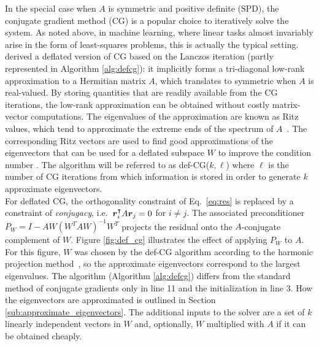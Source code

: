 \documentclass{article}
\begin{document}
In the special case when $A$ is symmetric and positive definite (SPD), the conjugate gradient method (CG) \cite{hestenes52} is a popular choice to iteratively solve the system. As noted above, in machine learning, where linear tasks almost invariably arise in the form of least-squares problems, this is actually the typical setting. \citet{saad00} derived a deflated version of CG based on the Lanczos iteration (partly represented in Algorithm \ref{alg:defcg}): it implicitly forms a tri-diagonal low-rank approximation to a Hermitian matrix $A$, which translates to symmetric when $A$ is real-valued. By storing quantities that are readily available from the CG iterations, the low-rank approximation can be obtained without costly matrix-vector computations. 
The eigenvalues of the approximation are known as Ritz values, which tend to approximate the extreme ends of the spectrum of $A$~\cite{saad11}. The corresponding Ritz vectors are used to find good approximations of the eigenvectors that can be used for a deflated subspace $W$ to improve the condition number \cite[see][for more details]{saad00}. 
The algorithm will be referred to as def-CG($k,\ell$) where $\ell$ is the number of CG iterations from which information is stored in order to generate $k$ approximate eigenvectors. 
\\
For deflated CG, the orthogonality constraint of Eq.~\eqref{eq:res} is replaced by a constraint of \emph{conjugacy}, i.e.~$\boldsymbol{r}_i^{\intercal} A\boldsymbol{r}_j=0$ for $i\neq j$.
The associated preconditioner $P_W=I-AW(W^T A W)^{-1}W^T$ projects the residual onto the $A$-conjugate complement of $W$. Figure \ref{fig:def_cg} illustrates the effect of applying $P_W$ to $A$. For this figure, $W$ was chosen by the def-CG algorithm according to the harmonic projection method~\cite{morgan95}, so the approximate eigenvectors correspond to the largest eigenvalues. The algorithm (Algorithm \ref{alg:defcg}) differs from the standard method of conjugate gradients only in line 11 and the initialization in line 3. How the eigenvectors are approximated is outlined in Section \ref{sub:approximate_eigenvectors}.
The additional inputs to the solver are a set of $k$ linearly independent vectors in $W$ and, optionally, $W$ multiplied with $A$ if it can be obtained cheaply. \\
\end{document}

